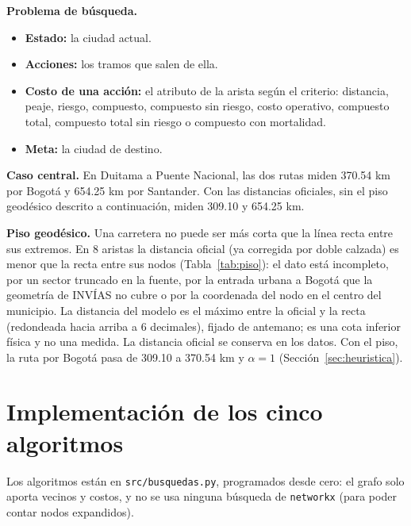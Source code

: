 \documentclass[12pt,a4paper]{article}
\begin{document}
\textbf{Problema de búsqueda.}
\begin{itemize}
\item \textbf{Estado:} la ciudad actual.
\item \textbf{Acciones:} los tramos que salen de ella.
\item \textbf{Costo de una acción:} el atributo de la arista según el
criterio: distancia, peaje, riesgo, compuesto, compuesto sin riesgo, costo
operativo, compuesto total, compuesto total sin riesgo o compuesto con
mortalidad.
\item \textbf{Meta:} la ciudad de destino.
\end{itemize}

\textbf{Caso central.} En Duitama a Puente Nacional, las dos rutas miden
370.54 km por Bogotá y 654.25 km por Santander. Con las distancias oficiales,
sin el piso geodésico descrito a continuación, miden 309.10 y 654.25 km.

\textbf{Piso geodésico.} Una carretera no puede ser más corta que la línea
recta entre sus extremos. En 8 aristas la distancia oficial (ya corregida por
doble calzada) es menor que la recta entre sus nodos
(Tabla~\ref{tab:piso}): el dato está incompleto, por un sector truncado en la
fuente, por la entrada urbana a Bogotá que la geometría de INVÍAS no cubre o
por la coordenada del nodo en el centro del municipio. La distancia del modelo es
el máximo entre la oficial y la recta (redondeada hacia arriba a 6 decimales),
fijado de antemano; es una cota inferior física y no una medida. La distancia
oficial se conserva en los datos. Con el piso, la ruta
por Bogotá pasa de 309.10 a 370.54 km y $\alpha = 1$
(Sección~\ref{sec:heuristica}).

\begin{table}[H]
\centering
\caption{Aristas con distancia oficial menor que la recta entre sus nodos y
distancia del modelo (con piso)}
\label{tab:piso}
\small

\end{table}

\section{Implementación de los cinco algoritmos}

Los algoritmos están en \texttt{src/busquedas.py}, programados desde cero: el
grafo solo aporta vecinos y costos, y no se usa ninguna búsqueda de
\texttt{networkx} (para poder contar nodos expandidos).
\end{document}

